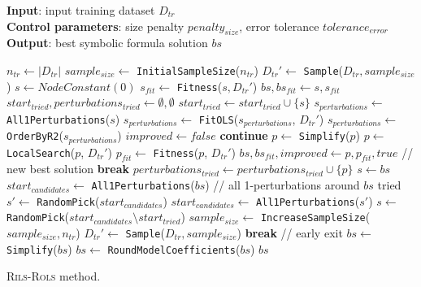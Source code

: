 \documentclass[a4paper,12pt]{elsarticle}
\begin{document}
\begin{algorithm}
	\footnotesize
	\hspace*{\algorithmicindent} \textbf{Input}: input training dataset $D_{tr}$ \\
	\hspace*{\algorithmicindent} \textbf{Control parameters}: size penalty $penalty_{size}$, error tolerance $tolerance_{error}$ \\
	\hspace*{\algorithmicindent} \textbf{Output}: best symbolic formula solution $bs$
	\begin{algorithmic}[1] 
		\State $n_{tr} \gets |D_{tr}|$
		\State $sample_{size} \gets $ \texttt{InitialSampleSize}($n_{tr}$)
		\State $D_{tr}' \gets$ \texttt{Sample}($D_{tr}, sample_{size}$)
		\State $s \gets NodeConstant(0)$ 
		\State $s_{fit} \gets$ \texttt{Fitness}($s, D_{tr}'$)
		\State $bs, bs_{fit} \gets s, s_{fit}$ \label{line:solSet}
		\State $start_{tried}, perturbations_{tried} \gets \emptyset, \emptyset$
		\State $start_{tried} \gets start_{tried} \cup \{s\}$
		\State $s_{perturbations} \gets $ \texttt{All1Perturbations}($s$) \label{line:sPert}
		\State $s_{perturbations} \gets $ \texttt{FitOLS}($s_{perturbations}$, $D_{tr}'$)
		\State $s_{perturbations} \gets $ \texttt{OrderByR2}($s_{perturbations}$) \label{line:orderR2}
		\State $improved \gets false $
		\State \textbf{continue}
		\EndIf
		\State $p \gets $ \texttt{Simplify}($p$) \label{line:simp}
		\State $p \gets $ \texttt{LocalSearch}($p$, $D_{tr}'$) \label{line:ls}
		\State $p_{fit} \gets$ \texttt{Fitness}($p$, $D_{tr}'$)
		 \label{line:avoid1}
		\State $bs, bs_{fit}, improved \gets p, p_{fit}, true$ // new best solution
		\State \textbf{break}
		\EndIf \label{line:avoid2}
		\State $perturbations_{tried} \gets perturbations_{tried} \cup \{p\}$
		\EndFor
		\State $s \gets bs$ \label{line:improved}
		\Else
		\State $start_{candidates} \gets $ \texttt{All1Perturbations}($bs$)
		 // all 1-perturbations around $bs$ tried
		\State $s' \gets $ \texttt{RandomPick}($start_{candidates}$)  \label{line:pert21}
		\State $start_{candidates} \gets $ \texttt{All1Perturbations}($s'$) \label{line:pert22}
		\EndIf
		\State $s \gets $ \texttt{RandomPick}($start_{candidates} \setminus start_{tried}$) \label{line:randPick}
		\State $sample_{size} \gets$ \texttt{IncreaseSampleSize}($sample_{size}, n_{tr}$) \label{line:sampleAdj1}
		\State $D_{tr}' \gets$ \texttt{Sample}($D_{tr}, sample_{size}$)\label{line:sampleAdj2}
		\EndIf
		\EndIf
		\State \textbf{break} // early exit
		\EndIf
		\EndWhile
		\State $bs \gets $ \texttt{Simplify}($bs$)
		\State $bs \gets $ \texttt{RoundModelCoefficients}($bs$)
		\State \Return $bs$
		\EndProcedure
	\end{algorithmic}
	\caption{\textsc{Rils}-\textsc{Rols}  method.}
	\label{alg:rilsrols}
\end{algorithm}  
\end{document}

